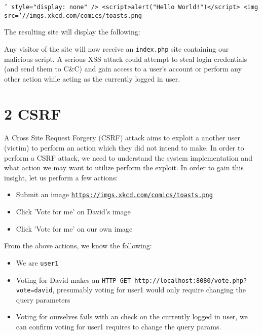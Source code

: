 \documentclass[a4paper, 12pt]{article}
\begin{document}
\texttt{\linebreak' style="display: none" />
\linebreak<script>alert("Hello World!")</script>
\linebreak<img src='//imgs.xkcd.com/comics/toasts.png
}
\linebreak

The resulting site will display the following:



Any visitor of the site will now receive an \texttt{index.php} site containing our malicious script. A serious XSS attack could attempt to steal login credentials (and send them to C\&C) and gain access to a user's account or perform any other action while acting as the currently logged in user.

\section*{2 CSRF}
A Cross Site Request Forgery (CSRF) attack aims to exploit a another user (victim) to perform an action which they did not intend to make. In order to perform a CSRF attack, we need to understand the system implementation and what action we may want to utilize perform the exploit. In order to gain this insight, let us perform a few actions:

\begin{itemize}
  \item Submit an image \texttt{\url{https://imgs.xkcd.com/comics/toasts.png}}
    \item Click 'Vote for me' on David's image
    \item Click 'Vote for me' on our own image
\end{itemize}

From the above actions, we know the following:
\begin{itemize}
  \item We are \texttt{user1}
  \item Voting for David makes an \texttt{HTTP GET http://localhost:8080/vote.php?vote=david}, presumably voting for user1 would only require changing the query parameters
    \item Voting for ourselves fails with an check on the currently logged in user, we can confirm voting for user1 requires to change the query params.
\end{itemize}
\end{document}
